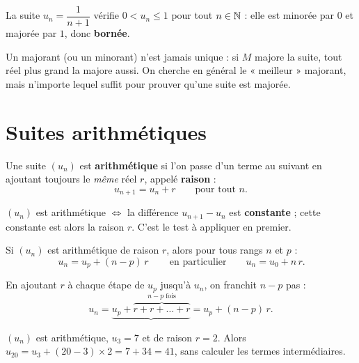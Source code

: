 \begin{exemple}
La suite $u_n=\dfrac{1}{n+1}$ vérifie $0<u_n\le 1$ pour tout $n\in\mathbb{N}$ : elle est minorée
par $0$ et majorée par $1$, donc \textbf{bornée}.
\end{exemple}

\begin{remarque}
Un majorant (ou un minorant) n'est jamais unique : si $M$ majore la suite, tout réel
plus grand la majore aussi. On cherche en général le « meilleur » majorant, mais
n'importe lequel suffit pour prouver qu'une suite est majorée.
\end{remarque}

\section{Suites arithmétiques}

\begin{definition}
Une suite $(u_n)$ est \textbf{arithmétique} si l'on passe d'un terme au suivant en
ajoutant toujours le \emph{même} réel $r$, appelé \textbf{raison} :
\[ u_{n+1}=u_n+r \qquad \text{pour tout } n. \]
\end{definition}

\begin{aretenir}
$(u_n)$ est arithmétique $\iff$ la différence $u_{n+1}-u_n$ est \textbf{constante} ;
cette constante est alors la raison $r$. C'est le test à appliquer en premier.
\end{aretenir}

\begin{theoreme}
Si $(u_n)$ est arithmétique de raison $r$, alors pour tous rangs $n$ et $p$ :
\[ \boxed{\,u_n = u_p + (n-p)\,r\,}\qquad\text{en particulier}\qquad u_n=u_0+n\,r. \]
\end{theoreme}

\begin{exemple}[Démonstration]
En ajoutant $r$ à chaque étape de $u_p$ jusqu'à $u_n$, on franchit $n-p$ pas :
\[ u_n=\underbrace{u_p+\overbrace{r+r+\dots+r}^{n-p \text{ fois}}}=u_p+(n-p)\,r. \]
\end{exemple}

\begin{exemple}
$(u_n)$ est arithmétique, $u_3=7$ et de raison $r=2$. Alors
$u_{20}=u_3+(20-3)\times 2=7+34=41$, sans calculer les termes intermédiaires.
\end{exemple}

